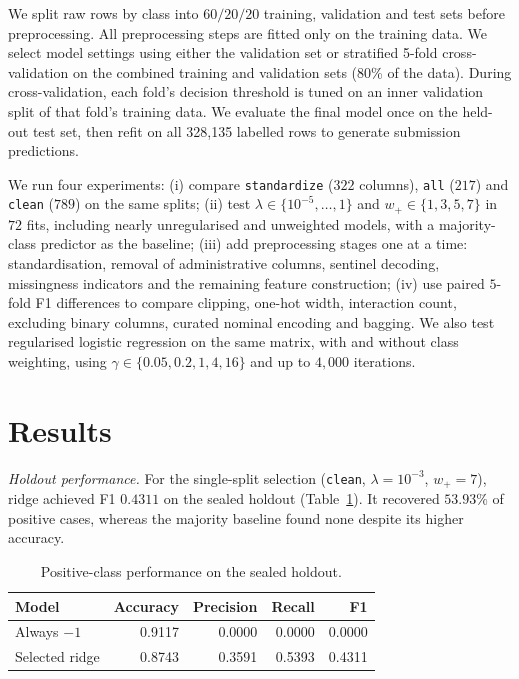 \documentclass[10pt,conference,compsocconf]{IEEEtran}
\begin{document}
We split raw rows by class into $60/20/20$ training, validation and test
sets before preprocessing. All preprocessing steps are fitted only on the
training data. We select model settings using either the validation set or stratified 5-fold cross-validation on the combined training and validation sets (80\% of the data). During cross-validation, each fold’s decision threshold is tuned on an inner validation split of that fold’s training data. We evaluate the final model once on the held-out test set, then refit on all 328,135 labelled rows to generate submission predictions.

 
We run four experiments:
(i) compare \texttt{standardize} ($322$ columns), \texttt{all} ($217$) and
\texttt{clean} ($789$) on the same splits;
(ii) test $\lambda\in\{10^{-5},\ldots,1\}$ and $w_{+}\in\{1,3,5,7\}$ in
$72$ fits, including nearly unregularised and unweighted models, with a
majority-class predictor as the baseline;
(iii) add preprocessing stages one at a time: standardisation, removal of
administrative columns, sentinel decoding, missingness indicators and the
remaining feature construction;
(iv) use paired $5$-fold F1 differences to compare clipping, one-hot width,
interaction count, excluding binary columns, curated nominal encoding and
bagging. We also test regularised logistic regression on the same matrix,
with and without class weighting, using
$\gamma\in\{0.05,0.2,1,4,16\}$ and up to $4{,}000$ iterations.

\section{Results}
\label{sec:results}

\textit{Holdout performance.}
For the single-split selection (\texttt{clean}, $\lambda=10^{-3}$,
$w_{+}=7$), ridge achieved F1 $0.4311$ on the sealed holdout
(Table~\ref{tab:holdout}). It recovered $53.93\%$ of positive cases,
whereas the majority baseline found none despite its higher accuracy.

\begin{table}[tbp]
  \centering
  \caption{Positive-class performance on the sealed holdout.}
  \label{tab:holdout}
  \small
  \setlength{\tabcolsep}{4pt}
  \begin{tabular}{lrrrr}
    \hline
    Model & Accuracy & Precision & Recall & F1 \\
    \hline
    Always $-1$ & 0.9117 & 0.0000 & 0.0000 & 0.0000 \\
    Selected ridge & 0.8743 & 0.3591 & 0.5393 & 0.4311 \\
    \hline
  \end{tabular}
\end{table}
\end{document}
